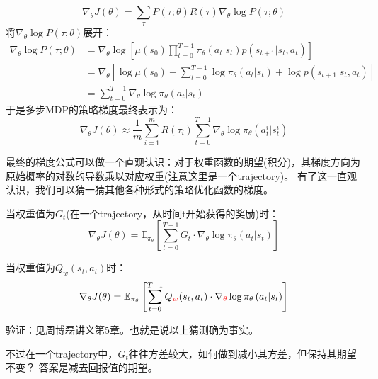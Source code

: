\documentclass[UTF8]{ctexart}
\begin{document}
\begin{equation}\nabla_{\theta} J(\theta)=\sum_{\tau} P(\tau ; \theta) R(\tau) \nabla_{\theta} \log P(\tau ; \theta)\end{equation}
将$\nabla_{\theta} \log P(\tau ; \theta)$展开：
\begin{equation}\begin{aligned}
    \nabla_{\theta} \log P(\tau ; \theta) &=\nabla_{\theta} \log \left[\mu\left(s_{0}\right) \prod_{t=0}^{T-1} \pi_{\theta}\left(a_{t} | s_{t}\right) p\left(s_{t+1} | s_{t}, a_{t}\right)\right] \\
    &=\nabla_{\theta}\left[\log \mu\left(s_{0}\right)+\sum_{t=0}^{T-1} \log \pi_{\theta}\left(a_{t} | s_{t}\right)+\log p\left(s_{t+1} | s_{t}, a_{t}\right)\right] \\
    &=\sum_{t=0}^{T-1} \nabla_{\theta} \log \pi_{\theta}\left(a_{t} | s_{t}\right)
    \end{aligned}
\end{equation}
于是多步MDP的策略梯度最终表示为：
\begin{equation}
\nabla_{\theta} J(\theta) \approx \frac{1}{m} \sum_{i=1}^{m} R\left(\tau_{i}\right) \sum_{t=0}^{T-1} \nabla_{\theta} 
\log \pi_{\theta}\left(a_{t}^{i} | s_{t}^{i}\right)
\end{equation}

最终的梯度公式可以做一个直观认识：{\color{red}对于权重函数的期望(积分)，其梯度方向为原始概率的对数的导数乘以对应权重(注意这里是一个trajectory)}。
有了这一直观认识，我们可以猜一猜其他各种形式的策略优化函数的梯度。

当权重值为$G_t$(在一个trajectory，从时间t开始获得的奖励)时：
\begin{equation} \label{JGt} \nabla_{\theta} J(\theta)=\mathbb{E}_{\pi_{\theta}}\left[\sum_{t=0}^{T-1} G_{t} 
    \cdot \nabla_{\theta} \log \pi_{\theta}\left(a_{t} | s_{t}\right)\right]\end{equation}

当权重值为$Q_{w}(s_t, a_t)$时：
\begin{equation} \label{JQsa}\nabla_{\theta} J(\theta)=\mathbb{E}_{\pi_{\theta}}\left[\sum_{t=0}^{T-1} Q_{\color{red}{w}}(s_t, a_t)
    \cdot \nabla_{\color{red}{\theta}} \log \pi_{\theta}\left(a_{t} | s_{t}\right)\right]\end{equation}

验证：见周博磊讲义第5章。也就是说以上猜测确为事实。

不过在一个trajectory中，$G_t$往往方差较大，如何做到减小其方差，但保持其期望不变？
答案是减去回报值的期望。
\end{document}
